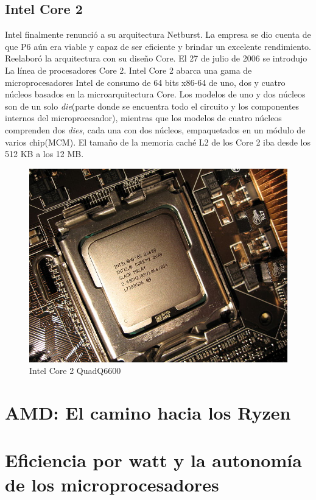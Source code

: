 \subsection{Intel Core 2}
Intel finalmente renunció a su arquitectura Netburst. La empresa se dio cuenta de que P6 aún era viable y capaz de ser eficiente y brindar 
un excelente rendimiento. Reelaboró la arquitectura con su diseño Core. El 27 de julio de 2006 se introdujo La línea de procesadores Core 2.
Intel Core 2 abarca una gama de microprocesadores Intel de consumo de 64 bits x86-64 de uno, dos y cuatro 
núcleos basados en la microarquitectura Core. Los modelos de uno y dos núcleos son de un solo \emph{die}(parte donde se encuentra todo el circuito y los componentes internos del microprocesador), 
mientras que los modelos de cuatro núcleos comprenden dos \emph{dies}, cada una con dos núcleos, empaquetados en un módulo de varios chip(MCM).
El tamaño de la memoria caché  L2 de los Core 2 iba desde los 512 KB a los 12 MB.

\begin{figure}[htb]
	\centering
	\includegraphics[scale = 0.8]{Graphics/IntelCore_2_Q6600.jpeg}
	\caption{Intel Core 2 QuadQ6600}
	\label{fig:24}
\end{figure}

\newpage


\section{AMD: El camino hacia los Ryzen}
\section{Eficiencia por watt y la autonomía de los microprocesadores}
